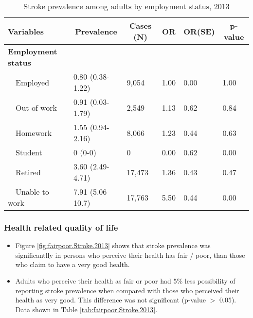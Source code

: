 \begin{table}[H]
\caption{Stroke prevalence among adults by employment status, 2013\label{tab:employ.Stroke.2013}} 
\begin{center}
\begin{tabular}{llllll}
\hline\hline
\multicolumn{1}{l}{Variables}&\multicolumn{1}{c}{Prevalence}&\multicolumn{1}{c}{Cases (N)}&\multicolumn{1}{c}{OR}&\multicolumn{1}{c}{OR(SE)}&\multicolumn{1}{c}{p-value}\tabularnewline
\hline
{\bfseries Employment status}&&&&&\tabularnewline
~~Employed&0.80 (0.38-1.22)& 9,054&1.00&0.00&1.00\tabularnewline
~~Out of work&0.91 (0.03-1.79)& 2,549&1.13&0.62&0.84\tabularnewline
~~Homework&1.55 (0.94-2.16)& 8,066&1.23&0.44&0.63\tabularnewline
~~Student&0 (0-0)&     0&0.00&0.62&0.00\tabularnewline
~~Retired&3.60 (2.49-4.71)&17,473&1.36&0.43&0.47\tabularnewline
~~Unable to work&7.91 (5.06-10.7)&17,763&5.50&0.44&0.00\tabularnewline
\hline
\end{tabular}\end{center}

\end{table}


 \newpage
\subsubsection{Health related quality of life}


 \begin{itemize}

\item Figure \ref{fig:fairpoor.Stroke.2013} shows that stroke prevalence was significantlly
 in persons who perceive their health has fair / poor,
than those who claim to have a very good health.

\item Adults who perceive their health as fair or poor had 5\% less possibility of reporting stroke prevalence when compared with those who perceived their health as very good. This difference was not significant (p-value $>$ 0.05). Data shown in Table \ref{tab:fairpoor.Stroke.2013}.

\end{itemize}

